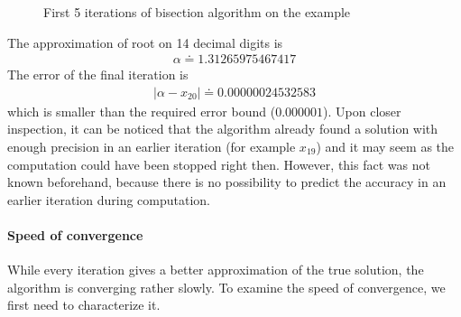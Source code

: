 \documentclass[
  digital, %
  table,   %
  nolof,     %
  nolot,     %
	draft, %
]{fithesis3}
\begin{document}
\begin{figure}
\centering
\def\FunctionF(#1){2*(#1)^4-3*(#1)-2}%
\caption{First 5 iterations of bisection algorithm on the example} \label{fig:bisp}
\end{figure}

The approximation of root on 14 decimal digits is
\begin{align}
      \alpha \doteq 1.31265975467417
\end{align}
The error of the final iteration is
\begin{align}
      |\alpha - x_{20}| \doteq 0.00000024532583
\end{align}
which is smaller than the required error bound ($0.000001$). Upon closer inspection, it can be noticed that the algorithm already found a solution with enough precision in an earlier iteration (for example $x_{19}$) and it may seem as the computation could have been stopped right then. However, this fact was not known beforehand, because there is no possibility to predict the accuracy in an earlier iteration during computation.

\paragraph{Speed of convergence}
While every iteration gives a better approximation of the true solution, the algorithm is converging rather slowly. To examine the speed of convergence, we first need to characterize it.
\end{document}
